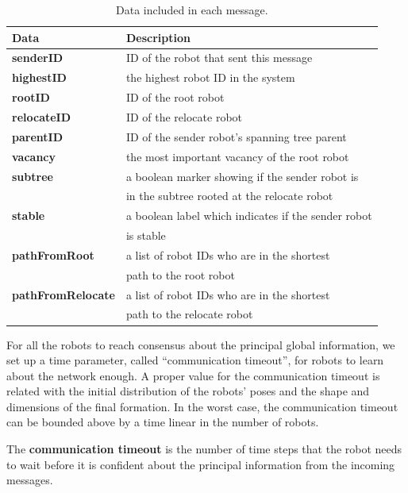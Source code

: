 \begin{table}
\caption{Data included in each message.}
   \begin{tabular}{ll}
    \toprule
    \textbf{Data}  & \textbf{Description}  \\
    \midrule
    \textbf{senderID} &  ID of the robot that sent this message\\
    \midrule
    \textbf{highestID} & the highest robot ID in the system\\
    \midrule
    \textbf{rootID} &  ID of the root robot\\
    \midrule
    \textbf{relocateID} &  ID of the relocate robot\\
    \midrule
    \textbf{parentID} &  ID of the sender robot's spanning tree parent \\
    \midrule
    \textbf{vacancy} & the most important vacancy of the root robot\\
    \midrule
    \textbf{subtree} & a boolean marker showing if the sender robot is \\
        & in the subtree rooted at the relocate robot \\
    \midrule
    \textbf{stable} & a boolean label which indicates if the sender robot \\
        & is stable\\
    \midrule
    \textbf{pathFromRoot} & a list of robot IDs who are in the shortest\\
        & path to the root robot\\
    \midrule
    \textbf{pathFromRelocate} & a list of robot IDs who are in the shortest \\
        & path to the relocate robot\\
    \bottomrule
  \end{tabular}

\label{tab:msg}
\end{table}

For all the robots to reach consensus about the principal global
information, 
we set up a time parameter, called ``communication timeout'', for robots to learn about the network enough. 
%
A proper value for the communication timeout is related with the
initial distribution of the robots' poses and the shape and dimensions of the
final formation. 
%
In the worst case, the communication timeout can be bounded
above by a time linear in the number of robots.


\begin{defn}
  \label{def:timeout}
  The \textbf{communication timeout} is the number of time steps that the robot
  needs to wait before it is confident about the principal information from the
  incoming messages.
\end{defn}


